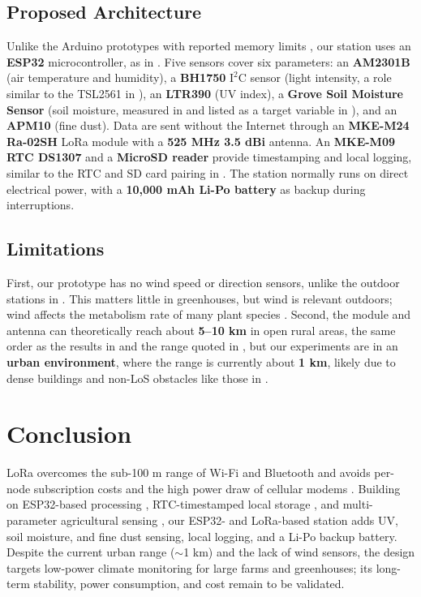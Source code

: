 \documentclass[conference]{IEEEtran}
\begin{document}
\subsection{Proposed Architecture}
Unlike the Arduino prototypes with reported memory limits \cite{dajnowski2024}, our station uses an \textbf{ESP32} microcontroller, as in \cite{hidayat2019, lopez2025, pietrosemoli2019}. Five sensors cover six parameters: an \textbf{AM2301B} (air temperature and humidity), a \textbf{BH1750} $\text{I}^2\text{C}$ sensor (light intensity, a role similar to the TSL2561 in \cite{hidayat2019}), an \textbf{LTR390} (UV index), a \textbf{Grove Soil Moisture Sensor} (soil moisture, measured in \cite{zennaro2025} and listed as a target variable in \cite{lopez2025}), and an \textbf{APM10} (fine dust). Data are sent without the Internet through an \textbf{MKE-M24 Ra-02SH} LoRa module with a \textbf{525 MHz 3.5 dBi} antenna. An \textbf{MKE-M09 RTC DS1307} and a \textbf{MicroSD reader} provide timestamping and local logging, similar to the RTC and SD card pairing in \cite{hidayat2019}. The station normally runs on direct electrical power, with a \textbf{10,000 mAh Li-Po battery} as backup during interruptions.

\subsection{Limitations}
First, our prototype has no wind speed or direction sensors, unlike the outdoor stations in \cite{dajnowski2024, zennaro2025, lopez2025, pietrosemoli2019, murdyantoro2019}. This matters little in greenhouses, but wind is relevant outdoors; wind affects the metabolism rate of many plant species \cite{dajnowski2024}. Second, the module and antenna can theoretically reach about \textbf{5--10 km} in open rural areas, the same order as the results in \cite{lopez2025} and the range quoted in \cite{dajnowski2024}, but our experiments are in an \textbf{urban environment}, where the range is currently about \textbf{1 km}, likely due to dense buildings and non-LoS obstacles like those in \cite{hidayat2019}.

\section{Conclusion}
LoRa overcomes the sub-100 m range of Wi-Fi and Bluetooth \cite{murdyantoro2019, lopez2025} and avoids per-node subscription costs and the high power draw of cellular modems \cite{zennaro2025}. Building on ESP32-based processing \cite{hidayat2019, lopez2025, pietrosemoli2019}, RTC-timestamped local storage \cite{hidayat2019}, and multi-parameter agricultural sensing \cite{zennaro2025, lopez2025}, our ESP32- and LoRa-based station adds UV, soil moisture, and fine dust sensing, local logging, and a Li-Po backup battery. Despite the current urban range ($\sim$1 km) and the lack of wind sensors, the design targets low-power climate monitoring for large farms and greenhouses; its long-term stability, power consumption, and cost remain to be validated.



\end{document}
